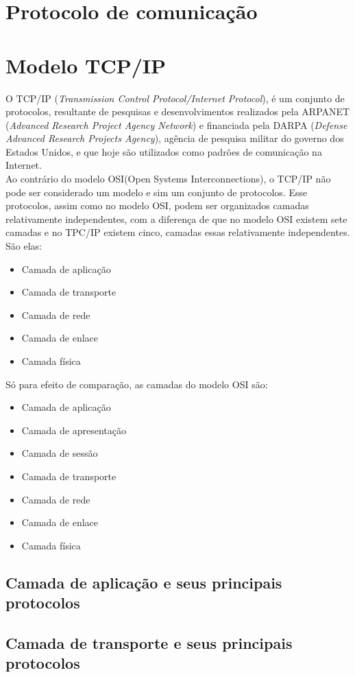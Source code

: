 \section{Protocolo de comunicação}
\section{Modelo TCP/IP}
O TCP/IP (\textit{Transmission Control Protocol/Internet Protocol}), é um conjunto de protocolos, resultante de pesquisas e desenvolvimentos realizados pela ARPANET (\textit{Advanced Research Project Agency Network}) e financiada pela DARPA (\textit{Defense Advanced Research Projects Agency}), agência de pesquisa militar do governo dos Estados Unidos, e que hoje são utilizados como padrões de comunicação na Internet.\\
Ao contrário do modelo OSI(Open Systems Interconnections), o TCP/IP não pode ser considerado um modelo e sim um conjunto de protocolos. Esse protocolos, assim como no modelo OSI, podem ser organizados camadas relativamente independentes, com a diferença de que no modelo OSI existem sete camadas e no TPC/IP existem cinco, camadas essas relativamente independentes. São elas:
\begin{itemize}
	\item Camada de aplicação
	\item Camada de transporte
	\item Camada de rede
	\item Camada de enlace
	\item Camada física
\end{itemize}
Só para efeito de comparação, as camadas do modelo OSI são:
\begin{itemize}
	\item Camada de aplicação
	\item Camada de apresentação
	\item Camada de sessão
	\item Camada de transporte
	\item Camada de rede
	\item Camada de enlace
	\item Camada física
\end{itemize}
\subsection{Camada de aplicação e seus principais protocolos}
\subsection{Camada de transporte e seus principais protocolos}
